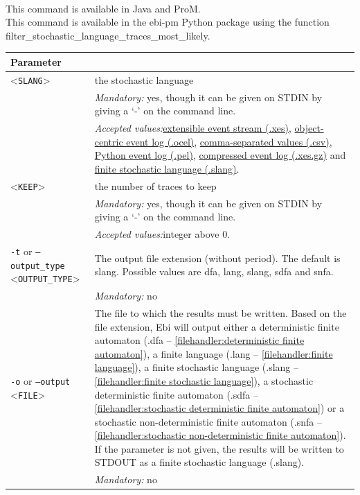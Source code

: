 {\\This command is available in Java and ProM.
\\This command is available in the ebi-pm Python package using the function filter\_stochastic\_language\_traces\_most\_likely.
\begin{tabularx}{\linewidth}{lX}
\toprule
Parameter \\\midrule
<\texttt{SLANG}>&the stochastic language\\
&\textit{Mandatory:} \quad yes, though it can be given on STDIN by giving a `-' on the command line.\\
&\textit{Accepted values:}\quad \hyperref[filehandler:extensible event stream]{extensible event stream (.xes)}, \hyperref[filehandler:object-centric event log]{object-centric event log (.ocel)}, \hyperref[filehandler:comma-separated values]{comma-separated values (.csv)}, \hyperref[filehandler:Python event log]{Python event log (.pel)}, \hyperref[filehandler:compressed event log]{compressed event log (.xes.gz)} and \hyperref[filehandler:finite stochastic language]{finite stochastic language (.slang)}.\\
<\texttt{KEEP}>&the number of traces to keep\\
&\textit{Mandatory:} \quad yes, though it can be given on STDIN by giving a `-' on the command line.\\
&\textit{Accepted values:}\quad integer above 0.\\
\texttt{-t} or \texttt{--output\_type} <\texttt{OUTPUT\_TYPE}> &
The output file extension (without period). The default is slang. Possible values are dfa, lang, slang, sdfa and snfa.\\
&\textit{Mandatory:} \quad no\\
\texttt{-o} or \texttt{--output} <\texttt{FILE}> &
The file to which the results must be written. Based on the file extension, Ebi will output either a deterministic finite automaton (.dfa -- \cref{filehandler:deterministic finite automaton}), a finite language (.lang -- \cref{filehandler:finite language}), a finite stochastic language (.slang -- \cref{filehandler:finite stochastic language}), a stochastic deterministic finite automaton (.sdfa -- \cref{filehandler:stochastic deterministic finite automaton}) or a stochastic non-deterministic finite automaton (.snfa -- \cref{filehandler:stochastic non-deterministic finite automaton}).
If the parameter is not given, the results will be written to STDOUT as a finite stochastic language (.slang).\\
&\textit{Mandatory:} \quad no\\

\end{tabularx}}

